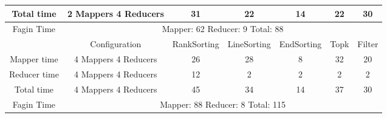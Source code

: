 \documentclass[a4paper]{article}
\begin{document}
\begin{table}[htbp]
\begin{center}
\begin{tabular}{|c|c|c|c|c|c|c|}
            Total time & 2 Mappers 4 Reducers & 31 & 22 & 14 & 22 & 30 \\
            \hline
            Fagin Time & \multicolumn{6}{|c|}{Mapper: 62 Reducer: 9 Total: 88}  \\
            \hline
            \hline
             & Configuration & RankSorting & LineSorting & EndSorting & Topk & Filter  \\
            \hline
            Mapper time & 4 Mappers 4 Reducers & 26 & 28 & 8 & 32 & 20  \\
            Reducer time & 4 Mappers 4 Reducers & 12 & 2 & 2 & 2 & 2   \\
            Total time & 4 Mappers 4 Reducers & 45 & 34 & 14 & 37 & 30 \\
            \hline
            Fagin Time & \multicolumn{6}{|c|}{Mapper: 88 Reducer: 8 Total: 115}  \\
            \hline
        \end{tabular}
    \end{center}
\end{table}
\end{document}
